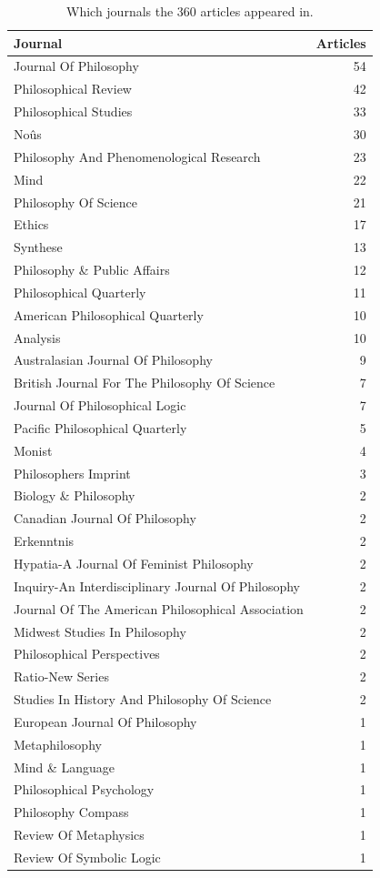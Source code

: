 \documentclass[
  10pt,
  letterpaper,
  DIV=11,
  numbers=noendperiod,
  twoside]{scrartcl}
\begin{document}
\begin{longtable}[]{@{}lr@{}}

\caption{\label{tbl-journals-in-main-bib}Which journals the 360 articles
appeared in.}

\tabularnewline

\toprule\noalign{}
Journal & Articles \\
\midrule\noalign{}
\endhead
\bottomrule\noalign{}
\endlastfoot
Journal Of Philosophy & 54 \\
Philosophical Review & 42 \\
Philosophical Studies & 33 \\
Noûs & 30 \\
Philosophy And Phenomenological Research & 23 \\
Mind & 22 \\
Philosophy Of Science & 21 \\
Ethics & 17 \\
Synthese & 13 \\
Philosophy \& Public Affairs & 12 \\
Philosophical Quarterly & 11 \\
American Philosophical Quarterly & 10 \\
Analysis & 10 \\
Australasian Journal Of Philosophy & 9 \\
British Journal For The Philosophy Of Science & 7 \\
Journal Of Philosophical Logic & 7 \\
Pacific Philosophical Quarterly & 5 \\
Monist & 4 \\
Philosophers Imprint & 3 \\
Biology \& Philosophy & 2 \\
Canadian Journal Of Philosophy & 2 \\
Erkenntnis & 2 \\
Hypatia-A Journal Of Feminist Philosophy & 2 \\
Inquiry-An Interdisciplinary Journal Of Philosophy & 2 \\
Journal Of The American Philosophical Association & 2 \\
Midwest Studies In Philosophy & 2 \\
Philosophical Perspectives & 2 \\
Ratio-New Series & 2 \\
Studies In History And Philosophy Of Science & 2 \\
European Journal Of Philosophy & 1 \\
Metaphilosophy & 1 \\
Mind \& Language & 1 \\
Philosophical Psychology & 1 \\
Philosophy Compass & 1 \\
Review Of Metaphysics & 1 \\
Review Of Symbolic Logic & 1 \\

\end{longtable}
\end{document}

